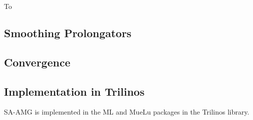 To 


\subsection{Smoothing Prolongators}
\subsection{Convergence}

\subsection{Implementation in Trilinos}
SA-AMG is implemented in the ML and MueLu packages in the Trilinos library.
